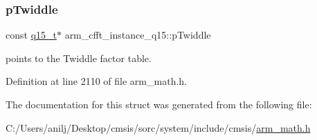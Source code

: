 \subsubsection{\texorpdfstring{p\+Twiddle}{pTwiddle}}
{\footnotesize\ttfamily const \hyperlink{arm__math_8h_ab5a8fb21a5b3b983d5f54f31614052ea}{q15\+\_\+t}$\ast$ arm\+\_\+cfft\+\_\+instance\+\_\+q15\+::p\+Twiddle}

points to the Twiddle factor table. 

Definition at line 2110 of file arm\+\_\+math.\+h.



The documentation for this struct was generated from the following file\+:\begin{DoxyCompactItemize}
\item 
C\+:/\+Users/anilj/\+Desktop/cmsis/sorc/system/include/cmsis/\hyperlink{arm__math_8h}{arm\+\_\+math.\+h}\end{DoxyCompactItemize}
